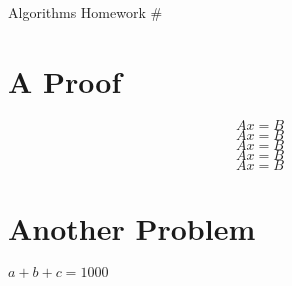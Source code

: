 \documentclass[12pt] {article}
\begin{document}
\begin{center}
    \large{Algorithms Homework \#}
\end{center}

\section{A Proof}
$$ Ax = B $$
$$ Ax = B $$
$$ Ax = B $$
$$ Ax = B $$
$$ Ax = B $$

\section{Another Problem}
$ a + b + c = 1000 $
\end{document}

